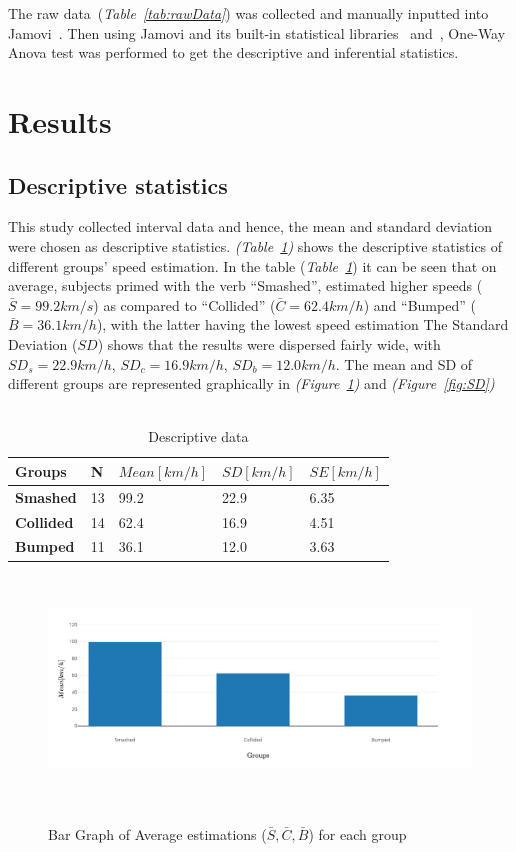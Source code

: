 \documentclass[11pt]{article}
\begin{document}
The raw data~(\textit{Table~\ref{tab:rawData}}) was collected and manually inputted into Jamovi~\cite{6}. Then using Jamovi and its built-in statistical libraries~\cite{7} and~\cite{8}, One-Way Anova test was performed to get the descriptive and inferential statistics. 
\section{Results}
\subsection{Descriptive statistics}
This study collected interval data and hence, the mean and standard deviation were chosen as descriptive statistics. \textit{(Table~\ref{tab:desc})} shows the descriptive statistics of different groups' speed estimation.
In the table (\textit{Table~\ref{tab:desc}}) it can be seen that on average, subjects primed with the verb ``Smashed'', estimated higher speeds ($\bar{S}=99.2km/s$) as compared to ``Collided'' ($\bar{C}=62.4km/h$)  and ``Bumped'' ($\bar{B}=36.1km/h$), with the latter having the lowest speed estimation
The Standard Deviation ($SD$) shows that the results were dispersed fairly wide, with $SD_s=22.9km/h$, $SD_c=16.9km/h$, $SD_b=12.0km/h$. The mean and SD of different groups are represented graphically in \textit{(Figure~\ref{fig:mean})} and \textit{(Figure~\ref{fig:SD})}


\begin{table}[!ht]
  \centering
  \caption{ ~\\Descriptive data}
  \begin{tabular}{|l|l|l|l|l|}
  \hline
      \textbf{Groups} & \textbf{N} & \textbf{$Mean [km/h]$} & \textbf{$SD [km/h]$} & \textbf{$SE [km/h]$} \\ \hline
      \textbf{Smashed} & 13 & 99.2 & 22.9 & 6.35 \\ \hline
      \textbf{Collided} & 14 & 62.4 & 16.9 & 4.51 \\ \hline
      \textbf{Bumped} & 11 & 36.1 & 12.0 & 3.63 \\ \hline
  \end{tabular}
~\label{tab:desc}
\end{table}

\begin{figure}[H]
  \caption{ ~\\Bar Graph of Average estimations ($\bar{S},\bar{C}, \bar{B}$) for each group} 
  \centering 
  \includegraphics[width=\textwidth]{mean.png}
~\label{fig:mean}
\end{figure}
\end{document}
